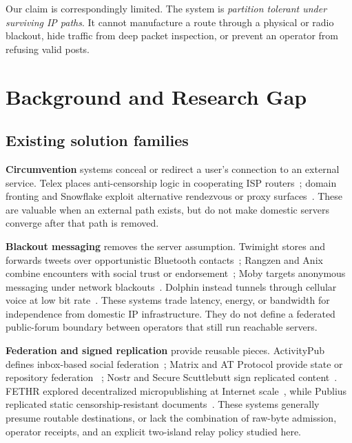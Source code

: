 \documentclass[sigconf,anonymous]{acmart}
\begin{document}
Our claim is correspondingly limited. The system is \emph{partition tolerant under surviving IP
paths}. It cannot manufacture a route through a physical or radio blackout, hide traffic from deep
packet inspection, or prevent an operator from refusing valid posts.

\section{Background and Research Gap}
\label{sec:background}

\subsection{Existing solution families}

\textbf{Circumvention} systems conceal or redirect a user's connection to an external service.
Telex places anti-censorship logic in cooperating ISP routers~\cite{wustrow2011telex}; domain
fronting and Snowflake exploit alternative rendezvous or proxy surfaces~\cite{fifield2015fronting,
bocovich2024snowflake}. These are valuable when an external path exists, but do not make domestic
servers converge after that path is removed.

\textbf{Blackout messaging} removes the server assumption. Twimight stores and forwards tweets over
opportunistic Bluetooth contacts~\cite{hossmann2011twimight}; Rangzen and Anix combine encounters with
social trust or endorsement~\cite{lerner2016rangzen,kamali2025anix}; Moby targets anonymous messaging
under network blackouts~\cite{pradeep2022moby}. Dolphin instead tunnels through cellular voice at low
bit rate~\cite{sharma2023dolphin}. These systems trade latency, energy, or bandwidth for independence
from domestic IP infrastructure. They do not define a federated public-forum boundary between
operators that still run reachable servers.

\textbf{Federation and signed replication} provide reusable pieces. ActivityPub defines inbox-based
social federation~\cite{activitypub}; Matrix and AT Protocol provide state or repository federation
~\cite{matrixspec,atproto}; Nostr and Secure Scuttlebutt sign replicated content~\cite{nostr,
tarr2019ssb}. FETHR explored decentralized micropublishing at Internet scale~\cite{sandler2009fethr},
while Publius replicated static censorship-resistant documents~\cite{waldman2000publius}. These
systems generally presume routable destinations, or lack the combination of raw-byte admission,
operator receipts, and an explicit two-island relay policy studied here.
\end{document}
